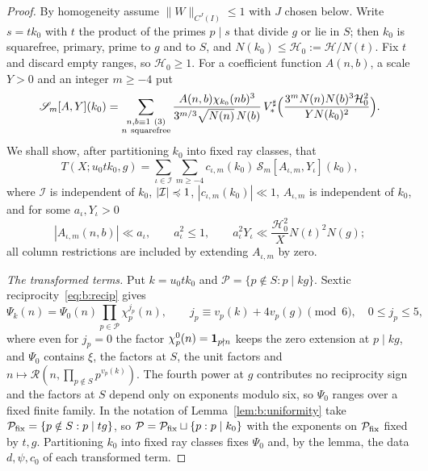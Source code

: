 \begin{proof}
By homogeneity assume $\|W\|_{C^J(I)}\le1$ with $J$ chosen below. Write $s=tk_0$ with $t$ the product of the primes $p\mid s$ that divide $g$ or lie in $S$; then $k_0$ is squarefree, primary, prime to $g$ and to $S$, and $N(k_0)\le\mathcal H_0:=\mathcal H/N(t)$. Fix $t$ and discard empty ranges, so $\mathcal H_0\ge1$. For a coefficient function $A(n,b)$, a scale $Y>0$ and an integer $m\ge-4$ put
\begin{equation}\label{eq:b:preparedsum}
  \mathscr S_m[A,Y](k_0)=\sum_{\substack{n,b\equiv1\ (3)\\n\ {\rm squarefree}}}\frac{A(n,b)\chi_{k_0}(nb)^3}{3^{m/3}\sqrt{N(n)}\,N(b)}\,V_*^\sharp\Bigl(\frac{3^mN(n)N(b)^3\mathcal H_0^2}{YN(k_0)^2}\Bigr).
\end{equation}
We shall show, after partitioning $k_0$ into fixed ray classes, that
\[
  T(X;u_0tk_0,g)=\sum_{\iota\in\mathcal I}\sum_{m\ge-4}c_{\iota,m}(k_0)\,\mathscr S_m[A_{\iota,m},Y_\iota](k_0),
\]
where $\mathcal I$ is independent of $k_0$, $|\mathcal I|\preccurlyeq1$, $|c_{\iota,m}(k_0)|\ll1$, $A_{\iota,m}$ is independent of $k_0$, and for some $a_\iota,Y_\iota>0$
\begin{equation}\label{eq:b:conductorbound}
  |A_{\iota,m}(n,b)|\ll a_\iota,\qquad a_\iota^2\le1,\qquad a_\iota^2Y_\iota\ll\frac{\mathcal H_0^2}XN(t)^2N(g);
\end{equation}
all column restrictions are included by extending $A_{\iota,m}$ by zero.

\emph{The transformed terms.} Put $k=u_0tk_0$ and $\mathcal P=\{p\notin S:p\mid kg\}$. Sextic reciprocity~\eqref{eq:b:recip} gives
\begin{equation}\label{eq:b:rowtwist}
  \Psi_k(n)=\Psi_0(n)\prod_{p\in\mathcal P}\chi_p^{j_p}(n),\qquad j_p\equiv v_p(k)+4v_p(g)\pmod6,\quad0\le j_p\le5,
\end{equation}
where even for $j_p=0$ the factor $\chi_p^0(n)=\mathbf{1}_{p\nmid n}$ keeps the zero extension at $p\mid kg$, and $\Psi_0$ contains $\xi$, the factors at $S$, the unit factors and $n\mapsto\mathcal R(n,\prod_{p\notin S}p^{v_p(k)})$. The fourth power at $g$ contributes no reciprocity sign and the factors at $S$ depend only on exponents modulo six, so $\Psi_0$ ranges over a fixed finite family. In the notation of Lemma~\ref{lem:b:uniformity} take $\mathcal P_{\rm fix}=\{p\notin S:p\mid tg\}$, so $\mathcal P=\mathcal P_{\rm fix}\sqcup\{p:p\mid k_0\}$ with the exponents on $\mathcal P_{\rm fix}$ fixed by $t,g$. Partitioning $k_0$ into fixed ray classes fixes $\Psi_0$ and, by the lemma, the data $d,\psi,c_0$ of each transformed term.


\end{proof}
